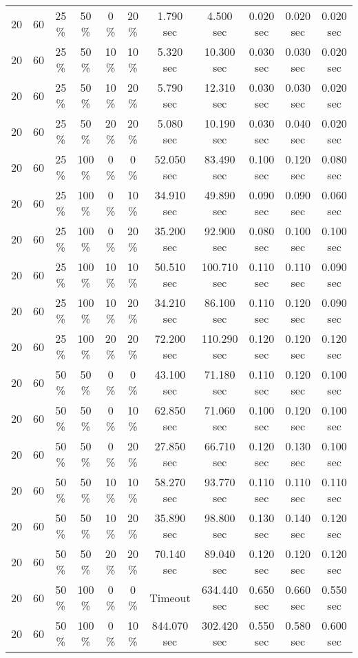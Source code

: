 \documentclass{article}
\begin{document}
\begin{longtable}[]{@{}ccccccccccc@{}}
20 & 60 & 25 \% & 50 \% & 0 \% & 20 \% & 1.790 sec & 4.500 sec & 0.020 sec & 0.020 sec & 0.020 sec \\
20 & 60 & 25 \% & 50 \% & 10 \% & 10 \% & 5.320 sec & 10.300 sec & 0.030 sec & 0.030 sec & 0.020 sec \\
20 & 60 & 25 \% & 50 \% & 10 \% & 20 \% & 5.790 sec & 12.310 sec & 0.030 sec & 0.030 sec & 0.020 sec \\
20 & 60 & 25 \% & 50 \% & 20 \% & 20 \% & 5.080 sec & 10.190 sec & 0.030 sec & 0.040 sec & 0.020 sec \\
20 & 60 & 25 \% & 100 \% & 0 \% & 0 \% & 52.050 sec & 83.490 sec & 0.100 sec & 0.120 sec & 0.080 sec \\
20 & 60 & 25 \% & 100 \% & 0 \% & 10 \% & 34.910 sec & 49.890 sec & 0.090 sec & 0.090 sec & 0.060 sec \\
20 & 60 & 25 \% & 100 \% & 0 \% & 20 \% & 35.200 sec & 92.900 sec & 0.080 sec & 0.100 sec & 0.100 sec \\
20 & 60 & 25 \% & 100 \% & 10 \% & 10 \% & 50.510 sec & 100.710 sec & 0.110 sec & 0.110 sec & 0.090 sec \\
20 & 60 & 25 \% & 100 \% & 10 \% & 20 \% & 34.210 sec & 86.100 sec & 0.110 sec & 0.120 sec & 0.090 sec \\
20 & 60 & 25 \% & 100 \% & 20 \% & 20 \% & 72.200 sec & 110.290 sec & 0.120 sec & 0.120 sec & 0.120 sec \\
20 & 60 & 50 \% & 50 \% & 0 \% & 0 \% & 43.100 sec & 71.180 sec & 0.110 sec & 0.120 sec & 0.100 sec \\
20 & 60 & 50 \% & 50 \% & 0 \% & 10 \% & 62.850 sec & 71.060 sec & 0.100 sec & 0.120 sec & 0.100 sec \\
20 & 60 & 50 \% & 50 \% & 0 \% & 20 \% & 27.850 sec & 66.710 sec & 0.120 sec & 0.130 sec & 0.100 sec \\
20 & 60 & 50 \% & 50 \% & 10 \% & 10 \% & 58.270 sec & 93.770 sec & 0.110 sec & 0.110 sec & 0.110 sec \\
20 & 60 & 50 \% & 50 \% & 10 \% & 20 \% & 35.890 sec & 98.800 sec & 0.130 sec & 0.140 sec & 0.120 sec \\
20 & 60 & 50 \% & 50 \% & 20 \% & 20 \% & 70.140 sec & 89.040 sec & 0.120 sec & 0.120 sec & 0.120 sec \\
20 & 60 & 50 \% & 100 \% & 0 \% & 0 \% & Timeout & 634.440 sec & 0.650 sec & 0.660 sec & 0.550 sec \\
20 & 60 & 50 \% & 100 \% & 0 \% & 10 \% & 844.070 sec & 302.420 sec & 0.550 sec & 0.580 sec & 0.600 sec \\

\end{longtable}
\end{document}
